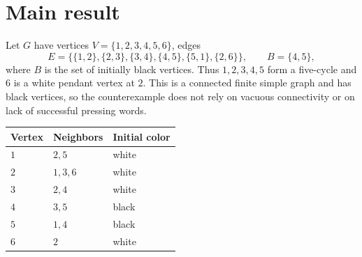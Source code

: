 \documentclass[11pt]{article}
\begin{document}
\section{Main result}
Let $G$ have vertices $V=\{1,2,3,4,5,6\}$, edges
\[
 E=\bigl\{\{1,2\},\{2,3\},\{3,4\},\{4,5\},\{5,1\},\{2,6\}\bigr\},
 \qquad B=\{4,5\},
\]
where $B$ is the set of initially black vertices. Thus $1,2,3,4,5$ form a
five-cycle and $6$ is a white pendant vertex at $2$. This is a connected
finite simple graph and has black vertices, so the counterexample does
not rely on vacuous connectivity or on lack of successful pressing words.

\begin{center}
\begin{tabular}{lll}
\toprule
Vertex & Neighbors & Initial color\\
\midrule
$1$ & $2,5$ & white\\
$2$ & $1,3,6$ & white\\
$3$ & $2,4$ & white\\
$4$ & $3,5$ & black\\
$5$ & $1,4$ & black\\
$6$ & $2$ & white\\
\bottomrule
\end{tabular}
\end{center}
\end{document}
